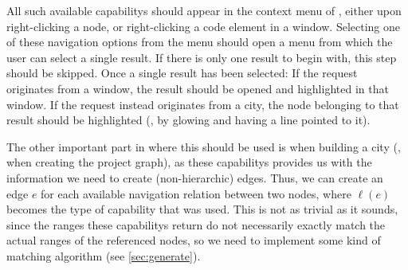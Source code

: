 \documentclass[../thesis]{subfiles}
\begin{document}
All such available \glspl{capability} should appear in the context menu of \SEE{}, either upon right-clicking a node, or right-clicking a code element in a \gls{window}.
Selecting one of these navigation options from the menu should open a menu from which the user can select a single result.
If there is only one result to begin with, this step should be skipped.
Once a single result has been selected:
If the request originates from a \gls{window}, the result should be opened and highlighted in that window.
If the request instead originates from a \gls{city}, the node belonging to that result should be highlighted (\eg, by glowing and having a line pointed to it).

The other important part in \SEE{} where this should be used is when building a city (\ie, when creating the project graph), as these \glspl{capability} provides us with the information we need to create (non-hierarchic) edges.
Thus, we can create an edge $e$ for each available navigation relation between two nodes, where $\ell(e)$ becomes the type of \gls{capability} that was used.
This is not as trivial as it sounds, since the \glspl{range} these \glspl{capability} return do not necessarily exactly match the actual \glspl{range} of the referenced nodes, so we need to implement some kind of matching algorithm (see \cref{sec:generate}).
\end{document}
